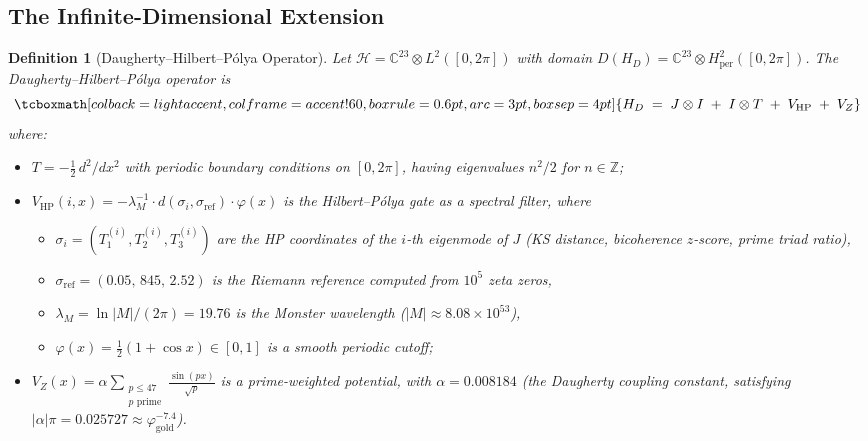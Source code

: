 \documentclass[11pt,a4paper]{article}
\theoremstyle{plain}
\newtheorem{definition}[theorem]{Definition}
\theoremstyle{remark}
\newcommand{\Z}{\mathbb{Z}}
\newcommand{\C}{\mathbb{C}}
\newcommand{\HH}{\mathcal{H}}
\begin{document}
\subsection{The Infinite-Dimensional Extension}
\label{sec:extension}

\begin{definition}[Daugherty--Hilbert--P\'olya Operator]\label{def:HD}
Let $\HH = \C^{23}\otimes L^2([0,2\pi])$ with domain
$D(H_D) = \C^{23}\otimes H^2_{\mathrm{per}}([0,2\pi])$.
The \emph{Daugherty--Hilbert--P\'olya operator} is
\begin{equation}\label{eq:HD}
  \tcboxmath[colback=lightaccent, colframe=accent!60,
    boxrule=0.6pt, arc=3pt, boxsep=4pt]{
    H_D \;=\; J\otimes I \;+\; I\otimes T \;+\; V_{\mathrm{HP}} \;+\; V_Z
  }
\end{equation}
where:
\begin{itemize}[nosep]
  \item $T = -\tfrac{1}{2}\,d^2/dx^2$ with periodic boundary conditions
        on $[0,2\pi]$, having eigenvalues $n^2/2$ for $n\in\Z$;
  \item $V_{\mathrm{HP}}(i,x)
        = -\lambda_M^{-1}\cdot d(\sigma_i,\sigma_{\mathrm{ref}})\cdot\varphi(x)$
        is the Hilbert--P\'olya gate as a spectral filter, where
        \begin{itemize}[nosep]
          \item $\sigma_i=(T_1^{(i)},T_2^{(i)},T_3^{(i)})$ are the HP
                coordinates of the $i$-th eigenmode of $J$ (KS distance,
                bicoherence $z$-score, prime triad ratio),
          \item $\sigma_{\mathrm{ref}}=(0.05,\,845,\,2.52)$ is the Riemann
                reference computed from $10^5$ zeta zeros,
          \item $\lambda_M = \ln|M|/(2\pi) = 19.76$ is the Monster wavelength
                ($|M|\approx 8.08\times 10^{53}$),
          \item $\varphi(x) = \tfrac{1}{2}(1+\cos x)\in[0,1]$ is a smooth
                periodic cutoff;
        \end{itemize}
  \item $V_Z(x) = \alpha\displaystyle\sum_{\substack{p\leq 47\\p\text{ prime}}}
        \frac{\sin(px)}{\sqrt{p}}$ is a prime-weighted potential, with
        $\alpha=0.008184$ (the Daugherty coupling constant, satisfying
        $|\alpha|\pi=0.025727\approx\varphi_{\mathrm{gold}}^{-7.4}$).
\end{itemize}
\end{definition}
\end{document}
